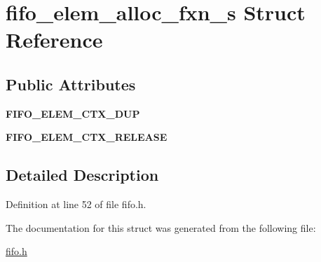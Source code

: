 \hypertarget{structfifo__elem__alloc__fxn__s}{}\section{fifo\+\_\+elem\+\_\+alloc\+\_\+fxn\+\_\+s Struct Reference}
\label{structfifo__elem__alloc__fxn__s}
\subsection*{Public Attributes}
\begin{DoxyCompactItemize}
\item 
{\bfseries F\+I\+F\+O\+\_\+\+E\+L\+E\+M\+\_\+\+C\+T\+X\+\_\+\+D\+UP}\hypertarget{structfifo__elem__alloc__fxn__s_a36dde3a05d964aa6f423e1ea287bcf05}{}\label{structfifo__elem__alloc__fxn__s_a36dde3a05d964aa6f423e1ea287bcf05}

\item 
{\bfseries F\+I\+F\+O\+\_\+\+E\+L\+E\+M\+\_\+\+C\+T\+X\+\_\+\+R\+E\+L\+E\+A\+SE}\hypertarget{structfifo__elem__alloc__fxn__s_a2108c9faba1a6f8bb9eaf8c8a2da8ea4}{}\label{structfifo__elem__alloc__fxn__s_a2108c9faba1a6f8bb9eaf8c8a2da8ea4}

\end{DoxyCompactItemize}


\subsection{Detailed Description}


Definition at line 52 of file fifo.\+h.



The documentation for this struct was generated from the following file\+:\begin{DoxyCompactItemize}
\item 
\hyperlink{fifo_8h}{fifo.\+h}\end{DoxyCompactItemize}
